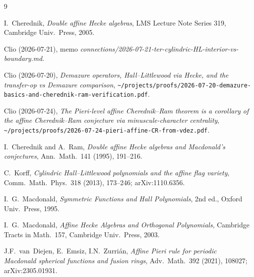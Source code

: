\documentclass[11pt]{article}
\theoremstyle{definition}
\begin{document}
\begin{thebibliography}{9}

I.~Cherednik, \emph{Double affine Hecke algebras}, LMS Lecture Note Series 319,
Cambridge Univ.\ Press, 2005.

Clio (2026-07-21), memo
\emph{connections/2026-07-21-ter-cylindric-HL-interior-vs-boundary.md}.

Clio (2026-07-20), \emph{Demazure operators, Hall--Littlewood via Hecke,
and the transfer-op vs Demazure comparison},
\verb|~/projects/proofs/2026-07-20-demazure-basics-and-cherednik-ram-verification.pdf|.

Clio (2026-07-24), \emph{The Pieri-level affine Cherednik--Ram theorem
is a corollary of the affine Cherednik--Ram conjecture via minuscule-character
centrality}, \verb|~/projects/proofs/2026-07-24-pieri-affine-CR-from-vdez.pdf|.

I.~Cherednik and A.~Ram, \emph{Double affine Hecke algebras and Macdonald's
conjectures}, Ann.\ Math.\ 141 (1995), 191--216.

C.~Korff, \emph{Cylindric Hall--Littlewood polynomials and the affine flag
variety}, Comm.\ Math.\ Phys.\ 318 (2013), 173--246; arXiv:1110.6356.

I.~G.~Macdonald, \emph{Symmetric Functions and Hall Polynomials},
2nd ed., Oxford Univ.\ Press, 1995.

I.~G.~Macdonald, \emph{Affine Hecke Algebras and Orthogonal Polynomials},
Cambridge Tracts in Math.\ 157, Cambridge Univ.\ Press, 2003.

J.F.~van~Diejen, E.~Emsiz, I.N.~Zurri\'an, \emph{Affine Pieri rule for
periodic Macdonald spherical functions and fusion rings}, Adv.\ Math.\ 392
(2021), 108027; arXiv:2305.01931.

\end{thebibliography}
\end{document}
